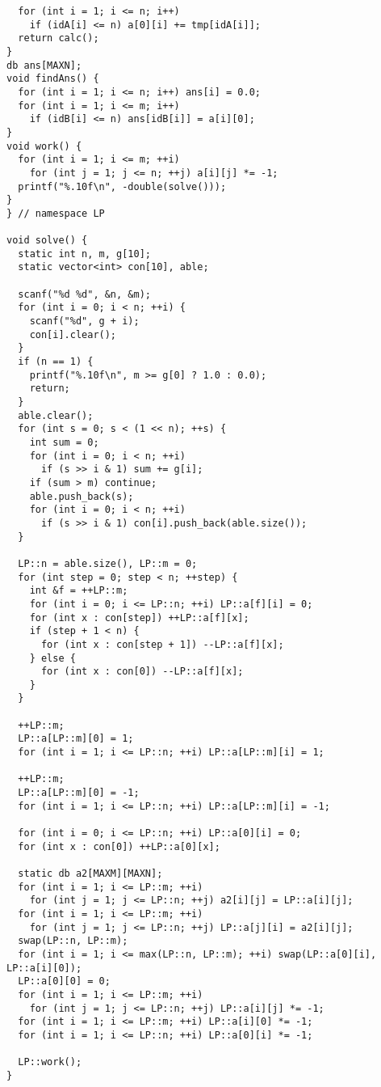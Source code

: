 \begin{lstlisting}
  for (int i = 1; i <= n; i++)
    if (idA[i] <= n) a[0][i] += tmp[idA[i]];
  return calc();
}
db ans[MAXN];
void findAns() {
  for (int i = 1; i <= n; i++) ans[i] = 0.0;
  for (int i = 1; i <= m; i++)
    if (idB[i] <= n) ans[idB[i]] = a[i][0];
}
void work() {
  for (int i = 1; i <= m; ++i)
    for (int j = 1; j <= n; ++j) a[i][j] *= -1;
  printf("%.10f\n", -double(solve()));
}
} // namespace LP

void solve() {
  static int n, m, g[10];
  static vector<int> con[10], able;

  scanf("%d %d", &n, &m);
  for (int i = 0; i < n; ++i) {
    scanf("%d", g + i);
    con[i].clear();
  }
  if (n == 1) {
    printf("%.10f\n", m >= g[0] ? 1.0 : 0.0);
    return;
  }
  able.clear();
  for (int s = 0; s < (1 << n); ++s) {
    int sum = 0;
    for (int i = 0; i < n; ++i)
      if (s >> i & 1) sum += g[i];
    if (sum > m) continue;
    able.push_back(s);
    for (int i = 0; i < n; ++i)
      if (s >> i & 1) con[i].push_back(able.size());
  }

  LP::n = able.size(), LP::m = 0;
  for (int step = 0; step < n; ++step) {
    int &f = ++LP::m;
    for (int i = 0; i <= LP::n; ++i) LP::a[f][i] = 0;
    for (int x : con[step]) ++LP::a[f][x];
    if (step + 1 < n) {
      for (int x : con[step + 1]) --LP::a[f][x];
    } else {
      for (int x : con[0]) --LP::a[f][x];
    }
  }

  ++LP::m;
  LP::a[LP::m][0] = 1;
  for (int i = 1; i <= LP::n; ++i) LP::a[LP::m][i] = 1;

  ++LP::m;
  LP::a[LP::m][0] = -1;
  for (int i = 1; i <= LP::n; ++i) LP::a[LP::m][i] = -1;

  for (int i = 0; i <= LP::n; ++i) LP::a[0][i] = 0;
  for (int x : con[0]) ++LP::a[0][x];

  static db a2[MAXM][MAXN];
  for (int i = 1; i <= LP::m; ++i)
    for (int j = 1; j <= LP::n; ++j) a2[i][j] = LP::a[i][j];
  for (int i = 1; i <= LP::m; ++i)
    for (int j = 1; j <= LP::n; ++j) LP::a[j][i] = a2[i][j];
  swap(LP::n, LP::m);
  for (int i = 1; i <= max(LP::n, LP::m); ++i) swap(LP::a[0][i], LP::a[i][0]);
  LP::a[0][0] = 0;
  for (int i = 1; i <= LP::m; ++i)
    for (int j = 1; j <= LP::n; ++j) LP::a[i][j] *= -1;
  for (int i = 1; i <= LP::m; ++i) LP::a[i][0] *= -1;
  for (int i = 1; i <= LP::n; ++i) LP::a[0][i] *= -1;

  LP::work();
}
\end{lstlisting}